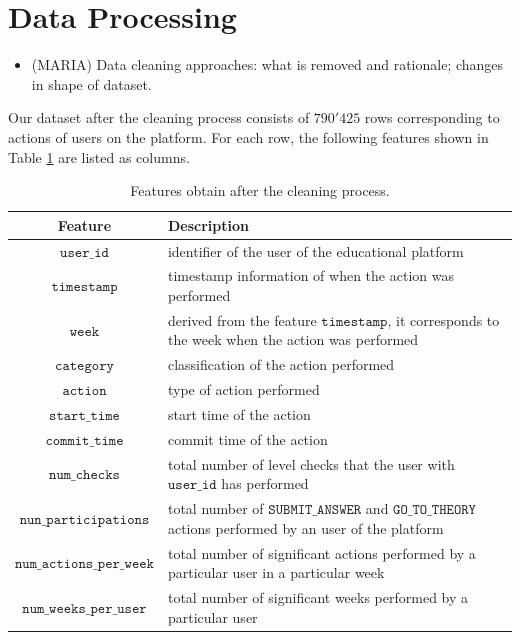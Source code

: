 \documentclass[sigplan,screen]{acmart}
\begin{document}
\section{Data Processing} \label{data:cleaning}

{\color{red}
\begin{itemize}
    \item (MARIA) Data cleaning approaches: what is removed and rationale; changes in shape of dataset.
\end{itemize}
}

Our dataset after the cleaning process consists of $790'425$ rows corresponding to actions of users on the platform. For each row, the following features shown in Table \ref{tab:features} are listed as columns.

\begin{table}[!ht]
  \caption{Features obtain after the cleaning process.}
  \label{tab:features}
  \begin{tabular}{cl}
    \toprule
    \textbf{Feature}&\textbf{Description}\\
    \midrule
    $\texttt{user\_id}$ & identifier of the user of the educational platform \\
    $\texttt{timestamp}$ & timestamp information of when the action was performed \\
    $\texttt{week}$ & derived from the feature $\texttt{timestamp}$, it corresponds to the week when the action was performed \\
    $\texttt{category}$ & classification of the action performed \\
    $\texttt{action}$ & type of action performed \\
    $\texttt{start\_time}$ & start time of the action \\
    $\texttt{commit\_time}$ & commit time of the action \\
    $\texttt{num\_checks}$ & total number of level checks that the user with $\texttt{user\_id}$ has performed \\
    $\texttt{nun\_participations}$ & total number of $\texttt{SUBMIT\_ANSWER}$ and $\texttt{GO\_TO\_THEORY}$ actions performed by an user of the platform \\
    $\texttt{num\_actions\_per\_week}$ & total number of significant actions performed by a particular user in a particular week \\
    $\texttt{num\_weeks\_per\_user}$ & total number of significant weeks performed by a particular user \\
    \bottomrule
    \end{tabular}
\end{table}
\end{document}
